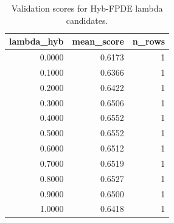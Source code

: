 \begin{table}[t]
\caption{Validation scores for Hyb-FPDE lambda candidates.}
\label{tab:lambda_distribution_computed}
\centering
\begin{tabular}{rrr}
\toprule
lambda\_hyb & mean\_score & n\_rows \\
\midrule
0.0000 & 0.6173 & 1 \\
0.1000 & 0.6366 & 1 \\
0.2000 & 0.6422 & 1 \\
0.3000 & 0.6506 & 1 \\
0.4000 & 0.6552 & 1 \\
0.5000 & 0.6552 & 1 \\
0.6000 & 0.6512 & 1 \\
0.7000 & 0.6519 & 1 \\
0.8000 & 0.6527 & 1 \\
0.9000 & 0.6500 & 1 \\
1.0000 & 0.6418 & 1 \\
\bottomrule
\end{tabular}

\end{table}
